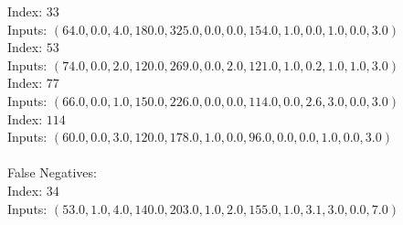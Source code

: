 \begin{enumerate}
\begin{enumerate}
					\textnormal{Index: } \( 33 \) \\
					\textnormal{Inputs: } \( (64.0, 0.0, 4.0, 180.0, 325.0, 0.0, 0.0, 154.0, 1.0, 0.0, 1.0, 0.0, 3.0) \) \\
					\textnormal{Index: } \( 53 \) \\
					\textnormal{Inputs: } \( (74.0, 0.0, 2.0, 120.0, 269.0, 0.0, 2.0, 121.0, 1.0, 0.2, 1.0, 1.0, 3.0) \) \\
					\textnormal{Index: } \( 77 \) \\
					\textnormal{Inputs: } \( (66.0, 0.0, 1.0, 150.0, 226.0, 0.0, 0.0, 114.0, 0.0, 2.6, 3.0, 0.0, 3.0) \) \\
					\textnormal{Index: } \( 114 \) \\
					\textnormal{Inputs: } \( (60.0, 0.0, 3.0, 120.0, 178.0, 1.0, 0.0, 96.0, 0.0, 0.0, 1.0, 0.0, 3.0) \) \\ \\
					\textnormal{False Negatives: } \\
					\textnormal{Index: } \( 34 \) \\
					\textnormal{Inputs: } \( (53.0, 1.0, 4.0, 140.0, 203.0, 1.0, 2.0, 155.0, 1.0, 3.1, 3.0, 0.0, 7.0) \) \\ 
					

\end{enumerate}
\end{enumerate}
